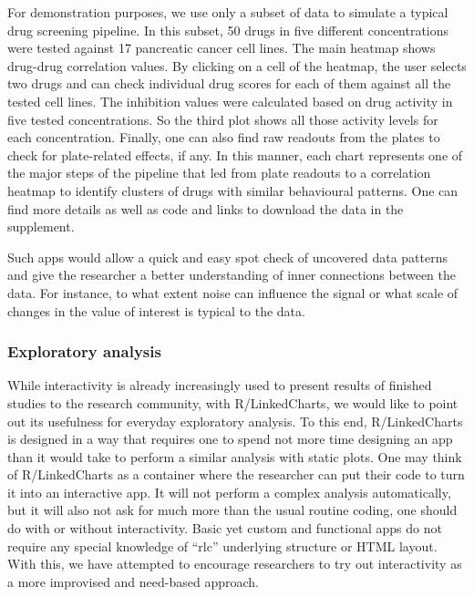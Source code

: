 \documentclass[twocolumn,10pt]{article}
\begin{document}
For demonstration purposes, we use only a subset of data to simulate a typical drug screening pipeline. In this subset, 50 drugs in five different concentrations were tested against 17 pancreatic cancer cell lines. The main heatmap shows drug-drug correlation values. By clicking on a cell of the heatmap, the user selects two drugs and can check individual drug scores for each of them against all the tested cell lines. The inhibition values were calculated based on drug activity in five tested concentrations. So the third plot shows all those activity levels for each concentration. Finally, one can also find raw readouts from the plates to check for plate-related effects, if any. In this manner, each chart represents one of the major steps of the pipeline that led from plate readouts to a correlation heatmap to identify clusters of drugs with similar behavioural patterns. One can find more details as well as code and links to download the data in the supplement. 

Such apps would allow a quick and easy spot check of uncovered data patterns and give the researcher a better understanding of inner connections between the data. For instance, to what extent noise can influence the signal or what scale of changes in the value of interest is typical to the data.

\subsubsection{Exploratory analysis}

While interactivity is already increasingly used to present results of finished studies to the research community, with R/LinkedCharts, we would like to point out its usefulness for everyday exploratory analysis. To this end, R/LinkedCharts is designed in a way that requires one to spend not more time designing an app than it would take to perform a similar analysis with static plots. One may think of R/LinkedCharts as a container where the researcher can put their code to turn it into an interactive app. It will not perform a complex analysis automatically, but it will also not ask for much more than the usual routine coding, one should do with or without interactivity. Basic yet custom and functional apps do not require any special knowledge of ``rlc'' underlying structure or HTML layout. With this, we have attempted to encourage researchers to try out interactivity as a more improvised and need-based approach.
\end{document}
